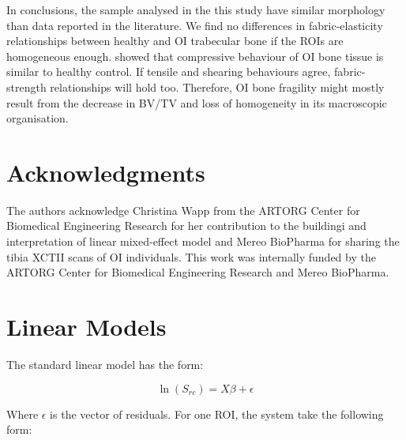 \documentclass[a4paper,fleqn]{DC_ArtStyle}
\begin{document}
In conclusions, the sample analysed in the this study have similar morphology than data reported in the literature. We find no differences in fabric-elasticity relationships between healthy and OI trabecular bone if the ROIs are homogeneous enough. \citeauthor{Indermaur2021}\cite{Indermaur2021} showed that compressive behaviour of OI bone tissue is similar to healthy control. If tensile and shearing behaviours agree, fabric-strength relationships will hold too. Therefore, OI bone fragility might mostly result from the decrease in BV/TV and loss of homogeneity in its macroscopic organisation.

\section*{Acknowledgments}
The authors acknowledge Christina Wapp from the ARTORG Center for Biomedical Engineering Research for her contribution to the buildingi and interpretation of linear mixed-effect model and Mereo BioPharma for sharing the tibia XCTII scans of OI individuals. This work was internally funded by the ARTORG Center for Biomedical Engineering Research and Mereo BioPharma.

\clearpage
\appendix
\section{Linear Models}\label{A1}

The standard linear model has the form:

\begin{equation}
	\ln(S_{rc}) = X \beta + \epsilon
\end{equation}

Where $\epsilon$ is the vector of residuals. For one ROI, the system take the following form:
\end{document}
